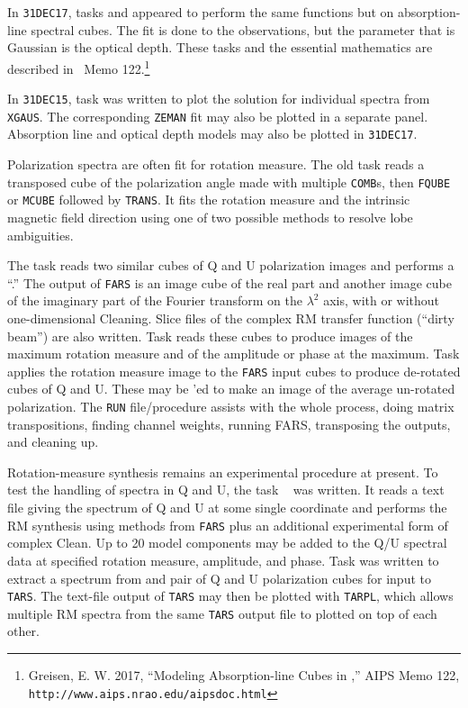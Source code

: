      In {\tt 31DEC17}, tasks {\tt {}} and {\tt {}}
appeared to perform the same functions but on absorption-line spectral
cubes.  The fit is done to the observations, but the parameter that is
Gaussian is the optical depth.  These tasks and the essential
mathematics are described in \AIPS\ Memo 122.\footnote{Greisen, E. W.
2017, ``Modeling Absorption-line Cubes in \AIPS,'' AIPS Memo 122, {\tt
http://www.aips.nrao.edu/aipsdoc.html}}

     In {\tt 31DEC15}, task {\tt {}} was written to plot the
solution for individual spectra from {\tt XGAUS}\@.  The corresponding
{\tt ZEMAN} fit may also be plotted in a separate panel.  Absorption
line and optical depth models may also be plotted in {\tt 31DEC17}\@.

     Polarization spectra are often fit for rotation measure.  The
old task {\tt {}} reads a transposed cube of the polarization
angle made with multiple {\tt COMB}s, then {\tt FQUBE} or {\tt MCUBE}
followed by {\tt TRANS}.  It fits the rotation measure and the
intrinsic magnetic field direction using one of two possible methods
to resolve lobe ambiguities.

     The task {\tt {}} reads two similar cubes of Q and U
polarization images and performs a ``.''  The output of {\tt FARS} is an image cube of the real
part and another image cube of the imaginary part of the Fourier
transform on the $\lambda^2$ axis, with or without one-dimensional
Cleaning.  Slice files of the complex RM transfer function (``dirty
beam'') are also written.  Task {\tt {}} reads these cubes
to produce images of the maximum rotation measure and of the amplitude
or phase at the maximum.  Task {\tt {}} applies the rotation
measure image to the {\tt FARS} input cubes to produce de-rotated
cubes of Q and U.  These may be {\tt {}}'ed to make an image
of the average un-rotated polarization.  The {\tt RUN} file/procedure
{\tt {}} assists with the whole process, doing matrix
transpositions, finding channel weights, running FARS, transposing the
outputs, and cleaning up.

     Rotation-measure synthesis remains an experimental procedure at
present.  To test the handling of spectra in Q and U, the task {\tt
{}} was written.  It reads a text file giving the spectrum of
Q and U at some single coordinate and performs the RM synthesis using
methods from {\tt FARS} plus an additional experimental form of
complex Clean.  Up to 20 model components may be added to the Q/U
spectral data at specified rotation measure, amplitude, and phase.
Task {\tt {}} was written to extract a spectrum from and
pair of Q and U polarization cubes for input to {\tt TARS}\@.  The
text-file output of {\tt TARS} may then be plotted with {\tt TARPL},
which allows multiple RM spectra from the same {\tt TARS} output file
to plotted on top of each other.

